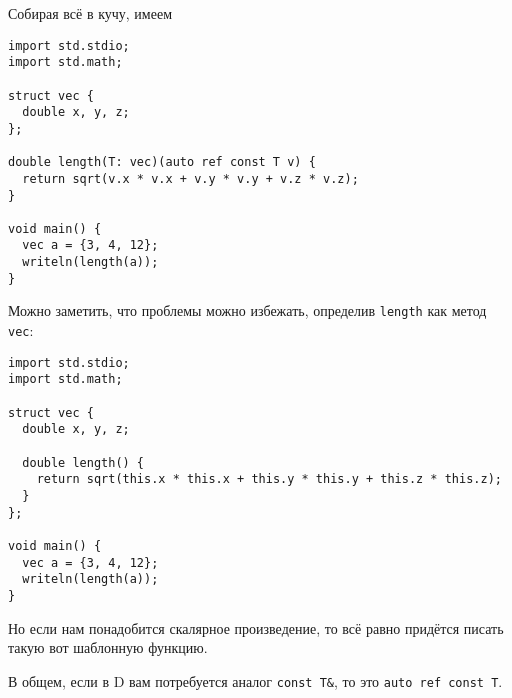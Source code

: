 Собирая всё в кучу, имеем
\begin{verbatim}
import std.stdio;
import std.math;

struct vec {
  double x, y, z;
};

double length(T: vec)(auto ref const T v) {
  return sqrt(v.x * v.x + v.y * v.y + v.z * v.z);
}

void main() {
  vec a = {3, 4, 12};
  writeln(length(a));
}
\end{verbatim}

Можно заметить, что проблемы можно избежать, определив \texttt{length} как метод \texttt{vec}:
\begin{verbatim}
import std.stdio;
import std.math;

struct vec {
  double x, y, z;

  double length() {
    return sqrt(this.x * this.x + this.y * this.y + this.z * this.z);
  }
};

void main() {
  vec a = {3, 4, 12};
  writeln(length(a));
}
\end{verbatim}
Но если нам понадобится скалярное произведение, то всё равно придётся писать такую вот шаблонную функцию.

В общем, если в D вам потребуется аналог \texttt{const~T\&}, то это \texttt{auto~ref~const~T}.
